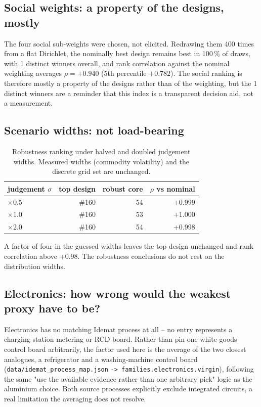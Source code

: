\documentclass[11pt,a4paper]{article}
\begin{document}
\subsection{Social weights: a property of the designs, mostly}

The four social sub-weights were chosen, not elicited. Redrawing them
400 times from a flat Dirichlet, the nominally best design remains best
in 100\,\% of draws, with 1 distinct winners overall, and
rank correlation against the nominal weighting averages $\rho=+0.940$
(5th percentile $+0.782$). The social ranking is therefore mostly a property
of the designs rather than of the weighting, but the 1 distinct
winners are a reminder that this index is a transparent decision aid, not a
measurement.

\subsection{Scenario widths: not load-bearing}

\begin{table}[h]
\centering\small
\caption{Robustness ranking under halved and doubled judgement widths.
Measured widths (commodity volatility) and the discrete grid set are unchanged.}
\begin{tabular}{lrrr}
\toprule
judgement $\sigma$ & top design & robust core & $\rho$ vs nominal \\
\midrule
$\times$0.5 & \#160 & 54 & +0.999 \\
$\times$1.0 & \#160 & 53 & +1.000 \\
$\times$2.0 & \#160 & 54 & +0.998 \\
\bottomrule
\end{tabular}
\end{table}

A factor of four in the guessed widths leaves the top design unchanged and rank
correlation above $+0.98$. The robustness conclusions do not rest on the
distribution widths.

\subsection{Electronics: how wrong would the weakest proxy have to be?}

Electronics has no matching Idemat process at all -- no entry represents a
charging-station metering or RCD board. Rather than pin one white-goods
control board arbitrarily, the factor used here is the average of the two
closest analogues, a refrigerator and a washing-machine control board
(\texttt{data/idemat\_process\_map.json}
\allowbreak\texttt{-> families.electronics.virgin}), following the same
"use the available evidence rather than one arbitrary pick" logic as the
aluminium choice. Both source processes explicitly exclude integrated
circuits, a real limitation the averaging does not resolve.
\end{document}
